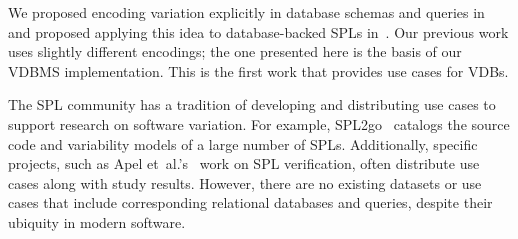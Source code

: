 \begin{comment}
--------------------------------------------------------------------------------------
* uses views to choose the subset of global schema per variant
* view integration or view merging ~\cite{sp94tkde, parsons02jmis, bln86acmcs}:
focuses on consistency checking, covering different, incomplete, and 
overlapping aspects in local view to retrieve one valid global view or sch.
* or view tailoring~\cite{bqr07cmer} aims at generating and composing views to
tailor the data of an underlying database schema for a given context. 
* View-based approaches~\cite{bqr07cmer} generate views on top of the global schema that emulate a schema variant for the client, which may be seen as an annotative approach. Thus, the global schema is still part of every DB schema vari- ant, the approach inherits the problems of the global schema. Unfortunately, the vari- ant?s schema complexity does even increase, because the additional schema elements for the view, emulating the variant, have to be included as well. Furthermore, there is additional effort to generate views when modeling the DB schema. This approach has benefits in data integrity, because the views emulating the schema variants can contain additional integrity constraints, which cannot be included into the global schema. Thus, the expressiveness of the model is also better than in the global schema approach



\end{comment}

We proposed encoding variation explicitly in database schemas and queries
in~\cite{ATW17dbpl} and proposed applying this idea to database-backed SPLs
in~\cite{ATW18poly}. Our previous work uses slightly different encodings; the
one presented here is the basis of our VDBMS implementation.
This is the first work that provides use cases for VDBs.


The SPL community has a tradition of developing and distributing use cases
to support research on software variation. For example, SPL2go~\cite{SPL2go}
catalogs the source code and variability models of a large number of SPLs.
Additionally, specific projects, such as Apel
et~al.'s~\cite{apel2013strategies} work on SPL verification, often distribute
use cases along with study results.
%
However, there are no existing datasets or use cases that include
corresponding relational databases and queries, despite their ubiquity in
modern software.


